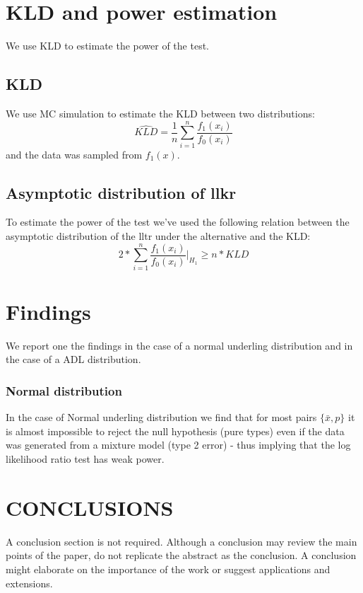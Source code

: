 \documentclass[a4paper, 10pt, conference]{ieeeconf}      %
\begin{document}
\section{KLD and power estimation}
We use KLD %
to estimate the power of the test.
\subsection{KLD}
We use MC simulation to estimate the KLD between two distributions:
\begin{equation}
 \hat{KLD} = \frac{1}{n}\sum_{i=1}^{n} \frac{f_1(x_i)}{f_0(x_i)}
 \end{equation} 
and the data was sampled from $f_1(x)$.
\subsection{Asymptotic distribution of llkr}
To estimate the power of the test we've used the following relation between the asymptotic distribution of the lltr under the alternative and the KLD:
\begin{equation}
2*\sum_{i=1}^{n}\frac{f_1(x_i)}{f_0(x_i)}|_{H_1} \geq n*KLD
\end{equation}
\section{Findings}
We report one the findings in the case of a normal underling distribution and in the case of a ADL distribution.

\subsubsection{Normal distribution} 
In the case of Normal underling distribution we find that for most pairs $\{\bar{x},p\}$ it is almost impossible to reject the null hypothesis (pure types) even if the data was generated from a mixture model (type 2 error) - thus implying that the log likelihood ratio test has weak power. 

\section{CONCLUSIONS}

A conclusion section is not required. Although a conclusion may review the main points of the paper, do not replicate the abstract as the conclusion. A conclusion might elaborate on the importance of the work or suggest applications and extensions. 
\end{document}
